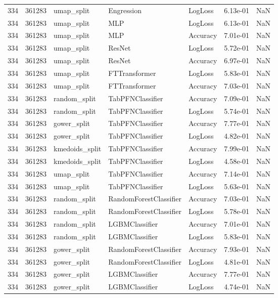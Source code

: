 \begin{tabular}{rrlllrr}
334 & 361283 & umap\_split & Engression & LogLoss & 6.13e-01 & NaN \\
334 & 361283 & umap\_split & MLP & LogLoss & 6.13e-01 & NaN \\
334 & 361283 & umap\_split & MLP & Accuracy & 7.01e-01 & NaN \\
334 & 361283 & umap\_split & ResNet & LogLoss & 5.72e-01 & NaN \\
334 & 361283 & umap\_split & ResNet & Accuracy & 6.97e-01 & NaN \\
334 & 361283 & umap\_split & FTTransformer & LogLoss & 5.83e-01 & NaN \\
334 & 361283 & umap\_split & FTTransformer & Accuracy & 7.03e-01 & NaN \\
334 & 361283 & random\_split & TabPFNClassifier & Accuracy & 7.09e-01 & NaN \\
334 & 361283 & random\_split & TabPFNClassifier & LogLoss & 5.74e-01 & NaN \\
334 & 361283 & gower\_split & TabPFNClassifier & Accuracy & 7.77e-01 & NaN \\
334 & 361283 & gower\_split & TabPFNClassifier & LogLoss & 4.82e-01 & NaN \\
334 & 361283 & kmedoids\_split & TabPFNClassifier & Accuracy & 7.99e-01 & NaN \\
334 & 361283 & kmedoids\_split & TabPFNClassifier & LogLoss & 4.58e-01 & NaN \\
334 & 361283 & umap\_split & TabPFNClassifier & Accuracy & 7.14e-01 & NaN \\
334 & 361283 & umap\_split & TabPFNClassifier & LogLoss & 5.63e-01 & NaN \\
334 & 361283 & random\_split & RandomForestClassifier & Accuracy & 7.03e-01 & NaN \\
334 & 361283 & random\_split & RandomForestClassifier & LogLoss & 5.78e-01 & NaN \\
334 & 361283 & random\_split & LGBMClassifier & Accuracy & 7.01e-01 & NaN \\
334 & 361283 & random\_split & LGBMClassifier & LogLoss & 5.83e-01 & NaN \\
334 & 361283 & gower\_split & RandomForestClassifier & Accuracy & 7.93e-01 & NaN \\
334 & 361283 & gower\_split & RandomForestClassifier & LogLoss & 4.81e-01 & NaN \\
334 & 361283 & gower\_split & LGBMClassifier & Accuracy & 7.77e-01 & NaN \\
334 & 361283 & gower\_split & LGBMClassifier & LogLoss & 4.74e-01 & NaN \\

\end{tabular}
